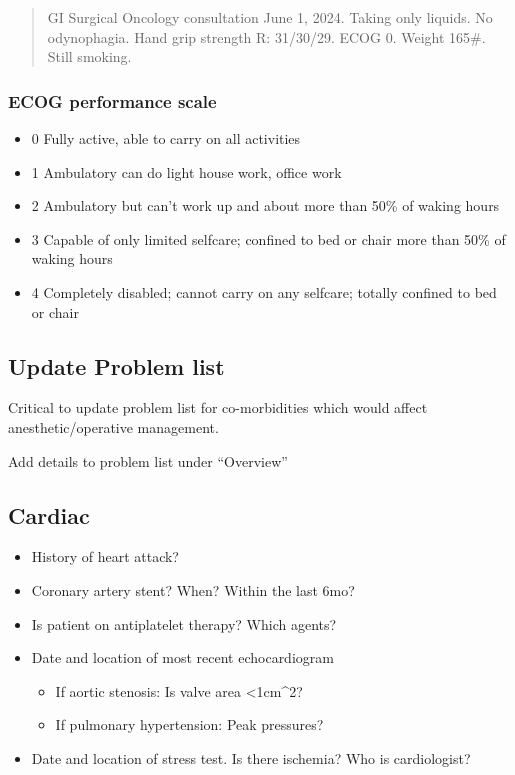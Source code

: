 \documentclass[
  letterpaper,
]{scrbook}
\providecommand{\tightlist}{%
  \setlength{\itemsep}{0pt}\setlength{\parskip}{0pt}}
\begin{document}
\begin{quote}
GI Surgical Oncology consultation June 1, 2024. Taking only liquids. No
odynophagia. Hand grip strength R: 31/30/29. ECOG 0. Weight 165\#. Still
smoking.
\end{quote}

\subsubsection{ECOG performance scale}\label{ecog-performance-scale}

\begin{itemize}
\tightlist
\item
  0 Fully active, able to carry on all activities
\item
  1 Ambulatory can do light house work, office work
\item
  2 Ambulatory but can't work up and about more than 50\% of waking
  hours
\item
  3 Capable of only limited selfcare; confined to bed or chair more than
  50\% of waking hours
\item
  4 Completely disabled; cannot carry on any selfcare; totally confined
  to bed or chair
\end{itemize}

\subsection{Update Problem list}\label{problem_list}

Critical to update problem list for co-morbidities which would affect
anesthetic/operative management.

Add details to problem list under ``Overview''

\subsection{Cardiac}\label{cardiac}

\begin{itemize}
\item
  History of heart attack?
\item
  Coronary artery stent? When? Within the last 6mo?
\item
  Is patient on antiplatelet therapy? Which agents?
\item
  Date and location of most recent echocardiogram

  \begin{itemize}
  \item
    If aortic stenosis: Is valve area \textless1cm\^{}2?
  \item
    If pulmonary hypertension: Peak pressures?
  \end{itemize}
\item
  Date and location of stress test. Is there ischemia? Who is
  cardiologist?
\end{itemize}
\end{document}
